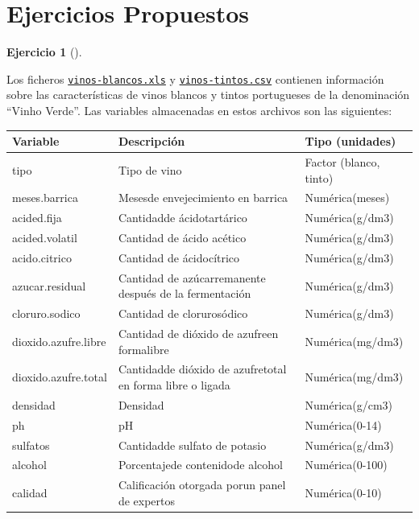 \documentclass[
  spanish,
  a4paper,
]{scrreport}
\theoremstyle{definition}
\newtheorem{exercise}{Ejercicio}[chapter]
\theoremstyle{remark}
\begin{document}
\section{Ejercicios Propuestos}\label{ejercicios-propuestos-1}

\begin{exercise}[]\protect\hypertarget{exr-preprocesaimento-5}{}\label{exr-preprocesaimento-5}

Los ficheros \href{datos/vinos-blancos.xls}{\texttt{vinos-blancos.xls}}
y \href{datos/vinos-tintos.csv}{\texttt{vinos-tintos.csv}} contienen
información sobre las características de vinos blancos y tintos
portugueses de la denominación ``Vinho Verde''. Las variables
almacenadas en estos archivos son las siguientes:

\begin{longtable}[]{@{}
  >{\raggedright\arraybackslash}p{}
  >{\raggedright\arraybackslash}p{}
  >{\raggedright\arraybackslash}p{}@{}}
\toprule\noalign{}
\begin{minipage}[b]{\linewidth}\raggedright
Variable
\end{minipage} & \begin{minipage}[b]{\linewidth}\raggedright
Descripción
\end{minipage} & \begin{minipage}[b]{\linewidth}\raggedright
Tipo (unidades)
\end{minipage} \\
\midrule\noalign{}
\endhead
\bottomrule\noalign{}
\endlastfoot
tipo & Tipo de vino & Factor (blanco, tinto) \\
meses.barrica & Mesesde envejecimiento en barrica & Numérica(meses) \\
acided.fija & Cantidadde ácidotartárico & Numérica(g/dm3) \\
acided.volatil & Cantidad de ácido acético & Numérica(g/dm3) \\
acido.citrico & Cantidad de ácidocítrico & Numérica(g/dm3) \\
azucar.residual & Cantidad de azúcarremanente después de la fermentación
& Numérica(g/dm3) \\
cloruro.sodico & Cantidad de clorurosódico & Numérica(g/dm3) \\
dioxido.azufre.libre & Cantidad de dióxido de azufreen formalibre &
Numérica(mg/dm3) \\
dioxido.azufre.total & Cantidadde dióxido de azufretotal en forma libre
o ligada & Numérica(mg/dm3) \\
densidad & Densidad & Numérica(g/cm3) \\
ph & pH & Numérica(0-14) \\
sulfatos & Cantidadde sulfato de potasio & Numérica(g/dm3) \\
alcohol & Porcentajede contenidode alcohol & Numérica(0-100) \\
calidad & Calificación otorgada porun panel de expertos &
Numérica(0-10) \\
\end{longtable}


\end{exercise}
\end{document}
